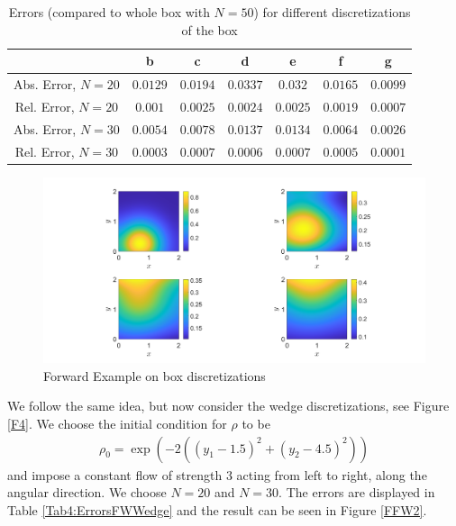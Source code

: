 \documentclass[11pt, a4paper]{article}
\theoremstyle{definition}
\begin{document}
\begin{table}
	\caption{Errors (compared to whole box with $N = 50$) for different discretizations of the box}
	\begin{tabular}{ ||c| c| c| c| c| c| c|| }
		\hline
		\hline
		& b & c & d & e & f & g\\ 
		\hline
		Abs. Error, $N =20$& $0.0129$ & $0.0194$ & $0.0337$& $0.032$&  $ 0.0165$ & $0.0099$ \\  
		Rel. Error, $N =20$& $0.001$& $0.0025$ & $0.0024$ & $0.0025$& $0.0019$  & $0.0007$ \\
		Abs. Error, $N =30$& $0.0054$ & $0.0078$ & $0.0137$ &$0.0134$&$0.0064$& $0.0026$\\  
		Rel. Error, $N =30$ & $0.0003$& $0.0007$ &$0.0006$ &$0.0007$&$0.0005$& $0.0001$\\
		\hline
		\hline
	\end{tabular}
	\label{Tab3:ErrorsFWBox}
\end{table}
\begin{figure}[h]
	\centering
	\includegraphics[scale=0.35]{FWBox.png}
	\caption{Forward Example on box discretizations} 
	\label{FFW1}
\end{figure}


We follow the same idea, but now consider the wedge discretizations, see Figure \ref{F4}. We choose the initial condition for $\rho$ to be
\begin{align*}
	\rho_0 = \exp(-2((y_1 - 1.5 )^2 + (y_2 - 4.5)^2))
\end{align*}
and impose a constant flow of strength $3$ acting from left to right, along the angular direction.
We choose $N = 20$ and $N = 30$. The errors are displayed in Table \ref{Tab4:ErrorsFWWedge} and the result can be seen in Figure \ref{FFW2}. 
\end{document}
